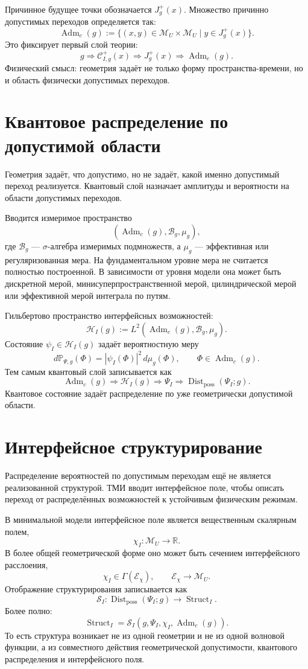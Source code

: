\documentclass[12pt,a4paper]{article}
\DeclareMathOperator{\Adm}{Adm}
\DeclareMathOperator{\Struct}{Struct}
\DeclareMathOperator{\Dist}{Dist}
\newcommand{\M}{\mathcal M_U}
\newcommand{\Hilb}{\mathcal H}
\newcommand{\Prob}{\mathbb P}
\begin{document}
Причинное будущее точки обозначается $J_g^+(x)$. Множество причинно допустимых переходов определяется так:
\[
\boxed{
\Adm_c(g):=
\{(x,y)\in\M\times\M\mid y\in J_g^+(x)\}.
}
\]
Это фиксирует первый слой теории:
\[
\boxed{g\Rightarrow \mathcal C^+_{I,g}(x)\Rightarrow J_g^+(x)\Rightarrow \Adm_c(g).}
\]
Физический смысл: геометрия задаёт не только форму пространства-времени, но и область физически допустимых переходов.

\section{Квантовое распределение по допустимой области}
Геометрия задаёт, что допустимо, но не задаёт, какой именно допустимый переход реализуется. Квантовый слой назначает амплитуды и вероятности на области допустимых переходов.

Вводится измеримое пространство
\[
(\Adm_c(g),\mathcal B_g,\mu_g),
\]
где $\mathcal B_g$ — $\sigma$-алгебра измеримых подмножеств, а $\mu_g$ — эффективная или регуляризованная мера. На фундаментальном уровне мера не считается полностью построенной. В зависимости от уровня модели она может быть дискретной мерой, минисуперпространственной мерой, цилиндрической мерой или эффективной мерой интеграла по путям.

Гильбертово пространство интерфейсных возможностей:
\[
\boxed{
\Hilb_I(g):=L^2(\Adm_c(g),\mathcal B_g,\mu_g).
}
\]
Состояние $\psi_I\in\Hilb_I(g)$ задаёт вероятностную меру
\[
\boxed{
d\Prob_{\Psi,g}(\Phi)=|\psi_I(\Phi)|^2\,d\mu_g(\Phi),
\qquad \Phi\in\Adm_c(g).
}
\]
Тем самым квантовый слой записывается как
\[
\boxed{
\Adm_c(g)\Rightarrow \Hilb_I(g)\Rightarrow \Psi_I\Rightarrow \Dist_{\mathrm{poss}}(\Psi_I;g).
}
\]
Квантовое состояние задаёт распределение по уже геометрически допустимой области.

\section{Интерфейсное структурирование}
Распределение вероятностей по допустимым переходам ещё не является реализованной структурой. ТМИ вводит интерфейсное поле, чтобы описать переход от распределённых возможностей к устойчивым физическим режимам.

В минимальной модели интерфейсное поле является вещественным скалярным полем,
\[
\boxed{\chi_I:\M\to\mathbb R.}
\]
В более общей геометрической форме оно может быть сечением интерфейсного расслоения,
\[
\boxed{\chi_I\in\Gamma(\mathcal E_\chi),\qquad \mathcal E_\chi\to\M.}
\]
Отображение структурирования записывается как
\[
\boxed{
\mathcal S_I:\Dist_{\mathrm{poss}}(\Psi_I;g)\longrightarrow \Struct_I.
}
\]
Более полно:
\[
\boxed{
\Struct_I=\mathcal S_I(g,\Psi_I,\chi_I,\Adm_c(g)).
}
\]
То есть структура возникает не из одной геометрии и не из одной волновой функции, а из совместного действия геометрической допустимости, квантового распределения и интерфейсного поля.
\end{document}
